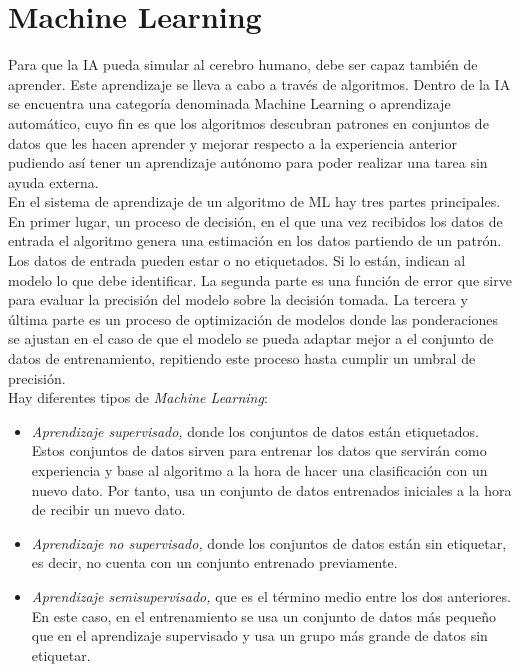 \section{Machine Learning}
Para que la IA pueda simular al cerebro humano, debe ser capaz también de aprender. Este aprendizaje se lleva a cabo a través de algoritmos. Dentro de la IA se encuentra una categoría denominada Machine Learning o aprendizaje automático, cuyo fin es que los algoritmos descubran patrones en conjuntos de datos que les hacen aprender y mejorar respecto a la experiencia anterior pudiendo así tener un aprendizaje autónomo para poder realizar una tarea sin ayuda externa.\\

En el sistema de aprendizaje de un algoritmo de ML hay tres partes principales. En primer lugar, un proceso de decisión, en el que una vez recibidos los datos de entrada el algoritmo genera una estimación en los datos partiendo de un patrón. Los datos de entrada pueden estar o no etiquetados. Si lo están, indican al modelo lo que debe identificar. La segunda parte es una función de error que sirve para evaluar la precisión del modelo sobre la decisión tomada. La tercera y última parte es un proceso de optimización de modelos donde las ponderaciones se ajustan en el caso de que el modelo se pueda adaptar mejor a el conjunto de datos de entrenamiento, repitiendo este proceso hasta cumplir un umbral de precisión.\\

Hay diferentes tipos de \textit{Machine Learning}:
\begin{itemize}
 \item \textit{Aprendizaje supervisado,} donde los conjuntos de datos están etiquetados. Estos conjuntos de datos sirven para entrenar los datos que servirán como experiencia y base al algoritmo a la hora de hacer una clasificación con un nuevo dato. Por tanto, usa un conjunto de datos entrenados iniciales a la hora de recibir un nuevo dato.
 \item \textit{Aprendizaje no supervisado,} donde los conjuntos de datos están sin etiquetar, es decir, no cuenta con un conjunto entrenado previamente.
 \item \textit{Aprendizaje semisupervisado,} que es el término medio entre los dos anteriores. En este caso, en el entrenamiento se usa un conjunto de datos más pequeño que en el aprendizaje supervisado y usa un grupo más grande de datos sin etiquetar.
\end{itemize}\

